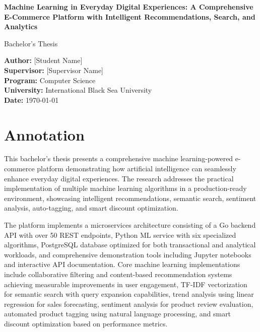 \documentclass[12pt]{article}
\begin{document}
\begin{titlepage}
    \begin{center}
        \vspace*{2cm}
        
        \Huge
        \textbf{Machine Learning in Everyday Digital Experiences: A Comprehensive E-Commerce Platform with Intelligent Recommendations, Search, and Analytics}
        
        \vspace{1.5cm}
        
        \Large
        Bachelor's Thesis
        
        \vspace{2cm}
        
        \large
        \textbf{Author:} [Student Name]\\
        \textbf{Supervisor:} [Supervisor Name]\\
        \textbf{Program:} Computer Science\\
        \textbf{University:} International Black Sea University\\
        \textbf{Date:} \today
        
    \end{center}
\end{titlepage}

\tableofcontents
\newpage

\section*{Annotation}
This bachelor's thesis presents a comprehensive machine learning-powered e-commerce platform demonstrating how artificial intelligence can seamlessly enhance everyday digital experiences. The research addresses the practical implementation of multiple machine learning algorithms in a production-ready environment, showcasing intelligent recommendations, semantic search, sentiment analysis, auto-tagging, and smart discount optimization.

The platform implements a microservices architecture consisting of a Go backend API with over 50 REST endpoints, Python ML service with six specialized algorithms, PostgreSQL database optimized for both transactional and analytical workloads, and comprehensive demonstration tools including Jupyter notebooks and interactive API documentation. Core machine learning implementations include collaborative filtering and content-based recommendation systems achieving measurable improvements in user engagement, TF-IDF vectorization for semantic search with query expansion capabilities, trend analysis using linear regression for sales forecasting, sentiment analysis for product review evaluation, automated product tagging using natural language processing, and smart discount optimization based on performance metrics.
\end{document}
